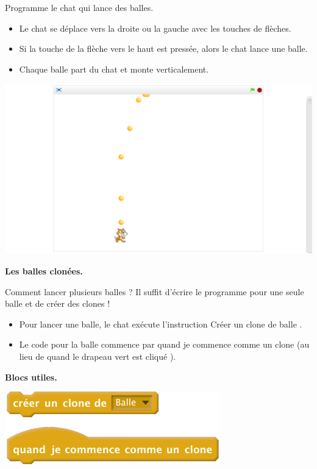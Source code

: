 \documentclass[class=report,crop=false, 12pt]{standalone}
\begin{document}
\begin{activite}

Programme le chat qui lance des balles.
\begin{itemize}
  \item Le chat se déplace vers la droite ou la gauche avec les touches de flèches.
  \item Si la touche de la flèche vers le haut est pressée, alors le chat lance une balle.
  \item Chaque balle part du chat et monte verticalement.
\end{itemize}


\begin{center}
  \includegraphics[scale=\scaleecran]{ecran-10-ex1} 
\end{center}


\bigskip

\textbf{Les balles clonées.}

Comment lancer plusieurs balles ? Il suffit d'écrire le programme pour une seule balle et de créer des clones !
\begin{itemize}
  \item Pour lancer une balle, le chat exécute l'instruction  \og Créer un clone de balle \fg{}.
  \item Le code pour la balle commence par \og quand je commence comme un clone \fg{} (au lieu de \og quand le drapeau vert est cliqué \fg{}).
\end{itemize}

\bigskip

\textbf{Blocs utiles.}

\begin{center}
  \includegraphics[scale=\scalebloc]{bloc-10-ex1} 
\end{center} 
  
\end{activite}
\end{document}
